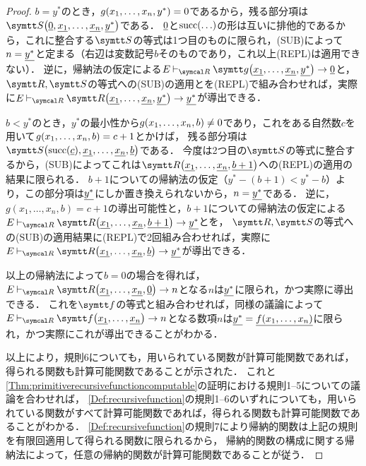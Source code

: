 \begin{proof}
	\(b = y^{\ast}\)のとき，\(\apply{g}{x_1, \dots, x_n, y^{\ast}} = 0\)であるから，残る部分項は\(\apply{\obj{S}}{\numeral{0}, \numeral{x_1}, \dots, \numeral{x_n}, \numeral{y^{\ast}}}\)である．
	\(\underline{0}\)と\(\apply{\succfunc}{\dots}\)の形は互いに排他的であるから，これに整合する\(\obj{S}\)の等式は1つ目のものに限られ，(SUB)によって\(n = \underline{y^{\ast}}\)と定まる（右辺は変数記号\(b\)そのものであり，これ以上(REPL)は適用できない）．
	逆に，帰納法の仮定による\(E \evaluatable \apply{\obj{g}}{\numeral{x_1}, \dots, \numeral{x_n}, \numeral{y^{\ast}}} \evaluate \numeral{0}\)と，\(\obj{R}, \obj{S}\)の等式への(SUB)の適用とを(REPL)で組み合わせれば，実際に\(E \evaluatable \apply{\obj{R}}{\numeral{x_1}, \dots, \numeral{x_n}, \numeral{y^{\ast}}} \evaluate \numeral{y^{\ast}}\)が導出できる．

	\(b < y^{\ast}\)のとき，\(y^{\ast}\)の最小性から\(\apply{g}{x_1, \dots, x_n, b} \neq 0\)であり，これをある自然数\(c\)を用いて\(\apply{g}{x_1, \dots, x_n, b} = c + 1\)とかけば，
	残る部分項は\(\apply{\obj{S}}{\apply{\succfunc}{\numeral{c}}, \numeral{x_1}, \dots, \numeral{x_n}, \numeral{b}}\)である．
	今度は2つ目の\(\obj{S}\)の等式に整合するから，(SUB)によってこれは\(\apply{\obj{R}}{\numeral{x_1}, \dots, \numeral{x_n}, \numeral{b + 1}}\)への(REPL)の適用の結果に限られる．
	\(b + 1\)についての帰納法の仮定（\(y^{\ast} - (b+1) < y^{\ast} - b\)）より，この部分項は\(\underline{y^{\ast}}\)にしか置き換えられないから，\(n = \underline{y^{\ast}}\)である．
	逆に，\(g(x_1, \dots, x_n, b) = c+1\)の導出可能性と，\(b+1\)についての帰納法の仮定による\(E \evaluatable \apply{\obj{R}}{\numeral{x_1}, \dots, \numeral{x_n}, \numeral{b+1}} \evaluate \numeral{y^{\ast}}\)とを，
	\(\obj{R}, \obj{S}\)の等式への(SUB)の適用結果に(REPL)で2回組み合わせれば，実際に\(E \evaluatable \apply{\obj{R}}{\numeral{x_1}, \dots, \numeral{x_n}, \numeral{b}} \evaluate \numeral{y^{\ast}}\)が導出できる．

	以上の帰納法によって\(b = 0\)の場合を得れば，\(E \evaluatable \apply{\obj{R}}{\numeral{x_1}, \dots, \numeral{x_n}, \numeral{0}} \evaluate n\)となる\(n\)は\(\underline{y^{\ast}}\)に限られ，かつ実際に導出できる．
	これを\(\obj{f}\)の等式と組み合わせれば，同様の議論によって\(E \evaluatable \apply{\obj{f}}{\numeral{x_1}, \dots, \numeral{x_n}} \evaluate n\)となる数項\(n\)は\(\numeral{y^{\ast}} = \numeral{\apply{f}{x_1, \dots, x_n}}\)に限られ，かつ実際にこれが導出できることがわかる．

	以上により，規則6についても，用いられている関数が計算可能関数であれば，得られる関数も計算可能関数であることが示された．
	これと\cref{Thm:primitiverecursivefunctioncomputable}の証明における規則1--5についての議論を合わせれば，
	\cref{Def:recursivefunction}の規則1--6のいずれについても，用いられている関数がすべて計算可能関数であれば，得られる関数も計算可能関数であることがわかる．
	\cref{Def:recursivefunction}の規則7により帰納的関数は上記の規則を有限回適用して得られる関数に限られるから，
	帰納的関数の構成に関する帰納法によって，任意の帰納的関数が計算可能関数であることが従う．
\end{proof}

